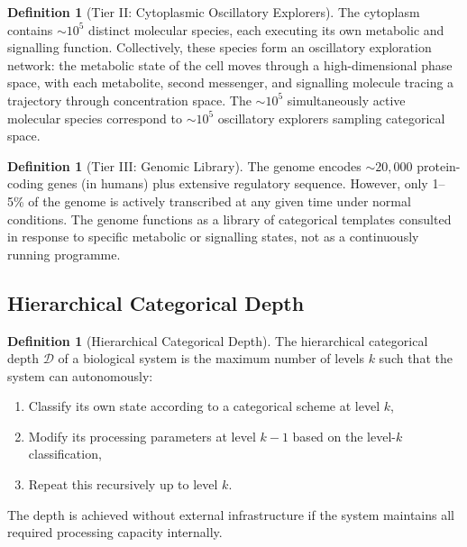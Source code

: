 \documentclass[11pt,twocolumn,a4paper]{article}
\theoremstyle{definition}
\newtheorem{definition}[theorem]{Definition}
\theoremstyle{remark}
\newcommand{\Dcat}{\mathcal{D}}
\begin{document}
\begin{definition}[Tier II: Cytoplasmic Oscillatory Explorers]
\label{def:tier2}
The cytoplasm contains $\sim\!10^5$ distinct molecular species, each executing its own metabolic and signalling function. Collectively, these species form an oscillatory exploration network: the metabolic state of the cell moves through a high-dimensional phase space, with each metabolite, second messenger, and signalling molecule tracing a trajectory through concentration space. The $\sim\!10^5$ simultaneously active molecular species correspond to $\sim\!10^5$ oscillatory explorers sampling categorical space.
\end{definition}

\begin{definition}[Tier III: Genomic Library]
\label{def:tier3}
The genome encodes $\sim\!20,000$ protein-coding genes (in humans) plus extensive regulatory sequence. However, only 1--5\% of the genome is actively transcribed at any given time under normal conditions. The genome functions as a library of categorical templates consulted in response to specific metabolic or signalling states, not as a continuously running programme.
\end{definition}

\subsection{Hierarchical Categorical Depth}

\begin{definition}[Hierarchical Categorical Depth]
\label{def:depth}
The hierarchical categorical depth $\Dcat$ of a biological system is the maximum number of levels $k$ such that the system can autonomously:
\begin{enumerate}[(1)]
  \item Classify its own state according to a categorical scheme at level $k$,
  \item Modify its processing parameters at level $k-1$ based on the level-$k$ classification,
  \item Repeat this recursively up to level $k$.
\end{enumerate}
The depth is achieved without external infrastructure if the system maintains all required processing capacity internally.
\end{definition}
\end{document}
